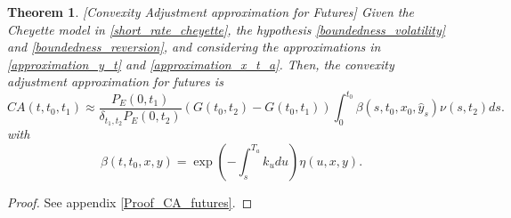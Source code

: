 \documentclass[a4paper,10pt]{article}
\newtheorem{theorem}{Theorem}[section]
\newcommand{\1}{\mathbf{1}}
\begin{document}
\begin{theorem}\label{Th_CA_futures}[Convexity Adjustment approximation for Futures]
Given the Cheyette model in \eqref{short_rate_cheyette}, the hypothesis \ref{boundedness_volatility} and \ref{boundedness_reversion}, and considering the approximations in \eqref{approximation_y_t} and \eqref{approximation_x_t_a}. Then, the convexity adjustment approximation for futures is 
\begin{equation}\label{ca_approximation_futures}
CA(t,t_0,t_1) \approx \frac{P_{E}(0,t_1)}{\delta_{t_1,t_2} P_{E}(0,t_2)} \left(G(t_0,t_2)  - G(t_0,t_1) \right) \int_{0}^{t_0} \beta(s,t_0,x_0,\hat{y}_s) \nu(s,t_2) ds. 
\end{equation}
with 
\begin{equation*}
\beta(t,t_0,x,y) = \exp\left(-\int_{s}^{T_a}k_u du \right) \eta(u,x,y).
\end{equation*}
\end{theorem}
\begin{proof}
See appendix \ref{Proof_CA_futures}.
\end{proof}
\end{document}
